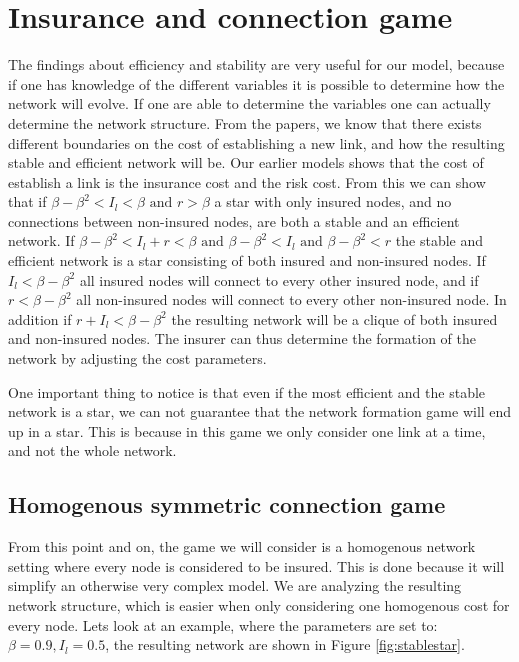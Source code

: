 \section{Insurance and connection game}
The findings about efficiency and stability are very useful for our model, because if one has knowledge of the different variables it is possible to determine how the network will evolve. If one are able to determine the variables one can actually determine the network structure.
From the papers, we know that there exists different boundaries on the cost of establishing a new link, and how the resulting stable and efficient network will be.
Our earlier models shows that the cost of establish a link is the insurance cost and the risk cost. From this we can show that if $\beta - \beta^2 <I_{l}<\beta \text{ and } r>\beta$ a star with only insured nodes, and no connections between non-insured nodes, are both a stable and an efficient network. If $\beta - \beta^2 <I_{l}+r<\beta \text{ and } \beta - \beta^2<I_{l} \text{ and } \beta - \beta^2<r $ the stable and efficient network is a star consisting of both insured and non-insured nodes. If $I_{l}<\beta-\beta^2$ all insured nodes will connect to every other insured node, and if $r<\beta-\beta^2$ all non-insured nodes will connect to every other non-insured node.
In addition if $r+I_{l}<\beta-\beta^2$ the resulting network will be a clique of both insured and non-insured nodes.
The insurer can thus determine the formation of the network by adjusting the cost parameters. 

One important thing to notice is that even if the most efficient and the stable network is a star, we can not guarantee that the network formation game will end up in a star. This is because in this game we only consider one link at a time, and not the whole network.

\subsection{Homogenous symmetric connection game}
From this point and on, the game we will consider is a homogenous network setting where every node is considered to be insured.
This is done because it will simplify an otherwise very complex model. We are analyzing the resulting network structure, which is easier when only considering one homogenous cost for every node.
Lets look at an example, where the parameters are set to: $\beta=0.9, I_{l}=0.5$, the resulting network are shown in Figure \ref{fig:stablestar}.



